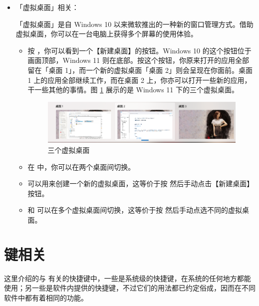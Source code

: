 \begin{itemize}
  \item 「虚拟桌面」相关：

  「虚拟桌面」是自 Windows 10 以来微软推出的一种新的窗口管理方式。借助虚拟桌面，你可以在一台电脑上获得多个屏幕的使用体验。
  \begin{itemize}
    \item 按 ，你可以看到一个【新建桌面】的按钮。Windows 10 的这个按钮位于画面顶部，Windows 11 则在底部。按这个按钮，你原来打开的应用全部留在「桌面 1」，而一个新的虚拟桌面「桌面 2」则会呈现在你面前。桌面 1 上的应用全部继续工作，而在桌面 2 上，你亦可以打开一些新的应用，干一些其他的事情。图 \ref{Virtual_desktop} 展示的是 Windows 11 下的三个虚拟桌面。
    \begin{figure}[htb!]
      \centering
      \includegraphics[width=10cm]{assets/Virtual_desktop.png}
      \caption{三个虚拟桌面}
      \label{Virtual_desktop}
    \end{figure}
    \item 在  中，你可以在两个桌面间切换。    
    \item {} 可以用来创建一个新的虚拟桌面，这等价于按  然后手动点击【新建桌面】按钮。
    \item {} 和  可以在多个虚拟桌面间切换，这等价于按  然后手动点选不同的虚拟桌面。
  \end{itemize}
\end{itemize}

\section{ 键相关}

这里介绍的与  有关的快捷键中，一些是系统级的快捷键，在系统的任何地方都能使用；另一些是软件内提供的快捷键，不过它们的用法都已约定俗成，因而在不同软件中都有着相同的功能。

